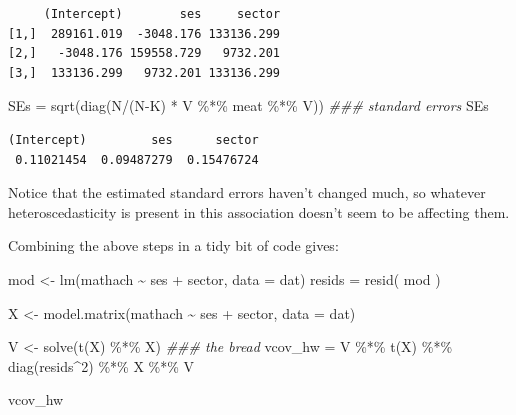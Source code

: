 \documentclass[
  letterpaper,
  DIV=11,
  numbers=noendperiod]{scrreprt}
\newenvironment{Shaded}{}{}
\newcommand{\AttributeTok}[1]{\textcolor[rgb]{0.49,0.56,0.16}{#1}}
\newcommand{\DecValTok}[1]{\textcolor[rgb]{0.25,0.63,0.44}{#1}}
\newcommand{\DocumentationTok}[1]{\textcolor[rgb]{0.73,0.13,0.13}{\textit{#1}}}
\newcommand{\FunctionTok}[1]{\textcolor[rgb]{0.02,0.16,0.49}{#1}}
\newcommand{\NormalTok}[1]{#1}
\newcommand{\OtherTok}[1]{\textcolor[rgb]{0.00,0.44,0.13}{#1}}
\newcommand{\SpecialCharTok}[1]{\textcolor[rgb]{0.25,0.44,0.63}{#1}}
\begin{document}
\begin{verbatim}
     (Intercept)        ses     sector
[1,]  289161.019  -3048.176 133136.299
[2,]   -3048.176 159558.729   9732.201
[3,]  133136.299   9732.201 133136.299
\end{verbatim}

\begin{Shaded}
\begin{Highlighting}[]
\NormalTok{SEs }\OtherTok{=} \FunctionTok{sqrt}\NormalTok{(}\FunctionTok{diag}\NormalTok{(N}\SpecialCharTok{/}\NormalTok{(N}\SpecialCharTok{{-}}\NormalTok{K) }\SpecialCharTok{*}\NormalTok{ V }\SpecialCharTok{\%*\%}\NormalTok{ meat }\SpecialCharTok{\%*\%}\NormalTok{ V)) }\DocumentationTok{\#\#\# standard errors}
\NormalTok{SEs}
\end{Highlighting}
\end{Shaded}

\begin{verbatim}
(Intercept)         ses      sector 
 0.11021454  0.09487279  0.15476724 
\end{verbatim}

Notice that the estimated standard errors haven't changed much, so
whatever heteroscedasticity is present in this association doesn't seem
to be affecting them.

Combining the above steps in a tidy bit of code gives:

\begin{Shaded}
\begin{Highlighting}[]
\NormalTok{mod }\OtherTok{\textless{}{-}} \FunctionTok{lm}\NormalTok{(mathach }\SpecialCharTok{\textasciitilde{}}\NormalTok{ ses }\SpecialCharTok{+}\NormalTok{ sector, }\AttributeTok{data =}\NormalTok{ dat)}
\NormalTok{resids }\OtherTok{=} \FunctionTok{resid}\NormalTok{( mod )}

\NormalTok{X }\OtherTok{\textless{}{-}} \FunctionTok{model.matrix}\NormalTok{(mathach }\SpecialCharTok{\textasciitilde{}}\NormalTok{ ses }\SpecialCharTok{+}\NormalTok{ sector, }\AttributeTok{data =}\NormalTok{ dat)}

\NormalTok{V }\OtherTok{\textless{}{-}} \FunctionTok{solve}\NormalTok{(}\FunctionTok{t}\NormalTok{(X) }\SpecialCharTok{\%*\%}\NormalTok{ X) }\DocumentationTok{\#\#\# the bread}
\NormalTok{vcov\_hw }\OtherTok{=}\NormalTok{ V }\SpecialCharTok{\%*\%} \FunctionTok{t}\NormalTok{(X) }\SpecialCharTok{\%*\%} \FunctionTok{diag}\NormalTok{(resids}\SpecialCharTok{\^{}}\DecValTok{2}\NormalTok{) }\SpecialCharTok{\%*\%}\NormalTok{ X }\SpecialCharTok{\%*\%}\NormalTok{ V}

\NormalTok{vcov\_hw}
\end{Highlighting}
\end{Shaded}
\end{document}
